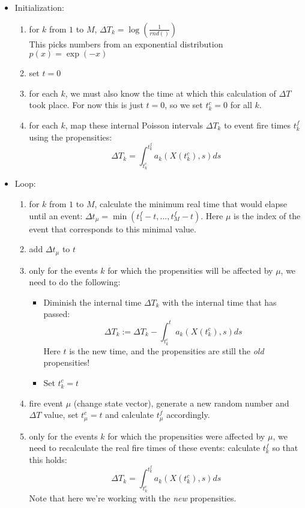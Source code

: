 \documentclass[a4paper,11pt]{article}
\begin{document}
			\begin{itemize}
				\item Initialization: 
				\begin{enumerate}
					\item for $k$ from $1$ to $M$, $\Delta T_k = \log\left(\frac{1}{rnd()}\right)$ \\
						This picks numbers from an exponential distribution $p(x) = \exp(-x)$
					\item set $t = 0$ 
					\item for each $k$, we must also know the time at which this calculation of
						$\Delta T$ took place. For now this is just $t = 0$, so we set $t^c_k = 0$ for
						all $k$.
					\item for each $k$, map these internal Poisson intervals $\Delta T_k$ to event fire times
						$t^f_k$ using the propensities: 
						\[ \Delta T_k = \int_{t^c_k}^{t^f_k} a_k(X(t^c_k),s) ds \]
	
				\end{enumerate}
	
				\item Loop:
				\begin{enumerate}
					\item for $k$ from $1$ to $M$, calculate the minimum real time that would elapse
						until an event: $\Delta t_\mu = \min(t^f_1 - t, ... , t^f_M - t)$. Here $\mu$
						is the index of the event that corresponds to this minimal value.
					\item add $\Delta t_\mu$ to $t$
	
					\item only for the events $k$ for which the propensities will be affected by $\mu$, we need to do
						the following:
						\begin{itemize}
							\item Diminish the internal time $\Delta T_k$ with the internal time that has passed: 
								\[ \Delta T_k := \Delta T_k - \int_{t^c_k}^{t} a_k(X(t^c_k),s) ds \]
								Here $t$ is the new
								time, and the propensities are still the {\em old} propensities!
							\item Set $t^c_k = t$
						\end{itemize}
	
					\item fire event $\mu$ (change state vector), generate a new random number and $\Delta T$ value, set
						$t^c_\mu = t$ and calculate $t^f_\mu$ accordingly.
	
					\item only for the events $k$ for which the propensities were affected by $\mu$, we need to recalculate
						the real fire times of these events: calculate $t^f_k$ so that this holds:
						\[\Delta T_k = \int_{t^c_k}^{t^f_k} a_k(X(t^c_k),s) ds \]
						Note that here we're working with the {\em new} propensities.
	
				\end{enumerate}
			\end{itemize}
	
\end{document}
